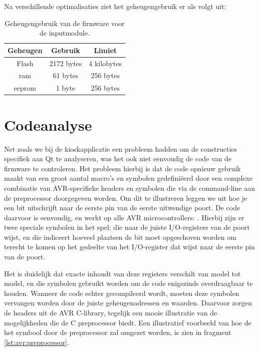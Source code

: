 Na verschillende optimalisaties ziet het geheugengebruik er als volgt uit:
\begin{table}[h!]
  \begin{center}
    \begin{tabular}{c c c}
    Geheugen & Gebruik & Limiet \\
    \hline
    Flash & 2172 bytes & 4 kilobytes \\
    \ac{ram} & 61 bytes & 256 bytes \\
    \ac{eeprom} & 1 byte & 256 bytes \\
    \end{tabular}
  \end{center}
  \caption{Geheugengebruik van de firmware voor de inputmodule.}
\end{table}

\section{Codeanalyse}

Net zoals we bij de kioskapplicatie een probleem hadden om de constructies specifiek aan Qt te analyseren, was het ook niet eenvoudig de code van de firmware te controleren. Het probleem hierbij is dat de code opnieuw gebruik maakt van een groot aantal macro's en symbolen gedefiniëerd door een complexe combinatie van AVR-specifieke headers en symbolen die via de command-line aan de preprocessor doorgegeven worden. Om dit te illustreren leggen we uit hoe je een bit uitschrijft naar de eerste pin van de eerste uitwendige poort. De code daarvoor is eenvoudig, en werkt op alle AVR microcontrollers: . Hierbij zijn er twee speciale symbolen in het spel:  die naar de juiste I/O-registers van de poort wijst, en  die indiceert hoeveel plaatsen de bit moet opgeschoven worden om terecht te komen op het gedeelte van het I/O-register dat wijst naar de eerste pin van de poort.

Het is duidelijk dat exacte inhoudt van deze registers verschilt van model tot model, en die symbolen gebruikt worden om de code enigszinds overdraagbaar te houden. Wanneer de code echter gecompileerd wordt, moeten deze symbolen vervangen worden door de juiste geheugenadressen en waarden. Daarvoor zorgen de headers uit de AVR C-library, tegelijk een mooie illustratie van de mogelijkheden die de C preprocessor biedt. Een illustratief voorbeeld van hoe de het  symbool door de preprocessor zal omgezet worden, is zien in fragment \ref{lst:avr:preprocessor}.

